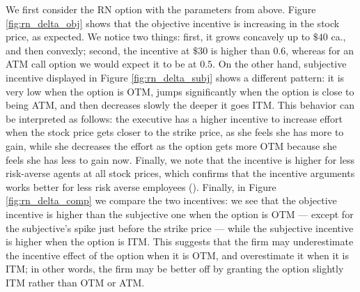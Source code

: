\vspace{1em}



We first consider the RN option with the parameters from above. Figure \ref*{fig:rn_delta_obj} shows that the objective incentive is increasing in the stock price, as expected. We notice two things: first, it grows concavely up to $\$40$ ca., and then convexly; second, the incentive at $\$30$ is higher than $0.6$, whereas for an ATM call option we would expect it to be at $0.5$. On the other hand, subjective incentive displayed in Figure \ref*{fig:rn_delta_subj} shows a different pattern: it is very low when the option is OTM, jumps significantly when the option is close to being ATM, and then decreases slowly the deeper it goes ITM. This behavior can be interpreted as follows: the executive has a higher incentive to increase effort when the stock price gets closer to the strike price, as she feels she has more to gain, while she decreases the effort as the option gets more OTM because she feels she has less to gain now. Finally, we note that the incentive is higher for less risk-averse agents at all stock prices, which confirms that the incentive arguments works better for less risk averse employees (\cite{lau2005valuation}). Finally, in Figure \ref*{fig:rn_delta_comp} we compare the two incentives: we see that the objective incentive is higher than the subjective one when the option is OTM --- except for the subjective's spike just before the strike price --- while the subjective incentive is higher when the option is ITM. This suggests that the firm may underestimate the incentive effect of the option when it is OTM, and overestimate it when it is ITM; in other words, the firm may be better off by granting the option slightly ITM rather than OTM or ATM.

